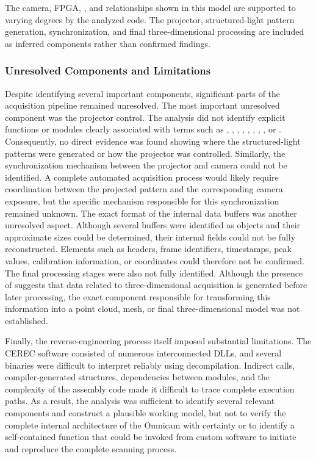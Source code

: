 The camera, FPGA, , and  relationships shown in this model are supported to varying degrees by the analyzed code. The projector, structured-light pattern generation, synchronization, and final three-dimensional processing are included as inferred components rather than confirmed findings.

\subsubsection{Unresolved Components and Limitations}

Despite identifying several important components, significant parts of the acquisition pipeline remained unresolved. The most important unresolved component was the projector control. The analysis did not identify explicit functions or modules clearly associated with terms such as , , , , , , , , or . Consequently, no direct evidence was found showing where the structured-light patterns were generated or how the projector was controlled. Similarly, the synchronization mechanism between the projector and camera could not be identified. A complete automated acquisition process would likely require coordination between the projected pattern and the corresponding camera exposure, but the specific mechanism responsible for this synchronization remained unknown. The exact format of the internal data buffers was another unresolved aspect. Although several buffers were identified as  objects and their approximate sizes could be determined, their internal fields could not be fully reconstructed. Elements such as headers, frame identifiers, timestamps, peak values, calibration information, or coordinates could therefore not be confirmed. The final processing stages were also not fully identified. Although the presence of  suggests that data related to three-dimensional acquisition is generated before later processing, the exact component responsible for transforming this information into a point cloud, mesh, or final three-dimensional model was not established.

Finally, the reverse-engineering process itself imposed substantial limitations. The CEREC software consisted of numerous interconnected DLLs, and several binaries were difficult to interpret reliably using decompilation. Indirect calls, compiler-generated structures, dependencies between modules, and the complexity of the assembly code made it difficult to trace complete execution paths. As a result, the analysis was sufficient to identify several relevant components and construct a plausible working model, but not to verify the complete internal architecture of the Omnicam with certainty or to identify a self-contained function that could be invoked from custom software to initiate and reproduce the complete scanning process.


